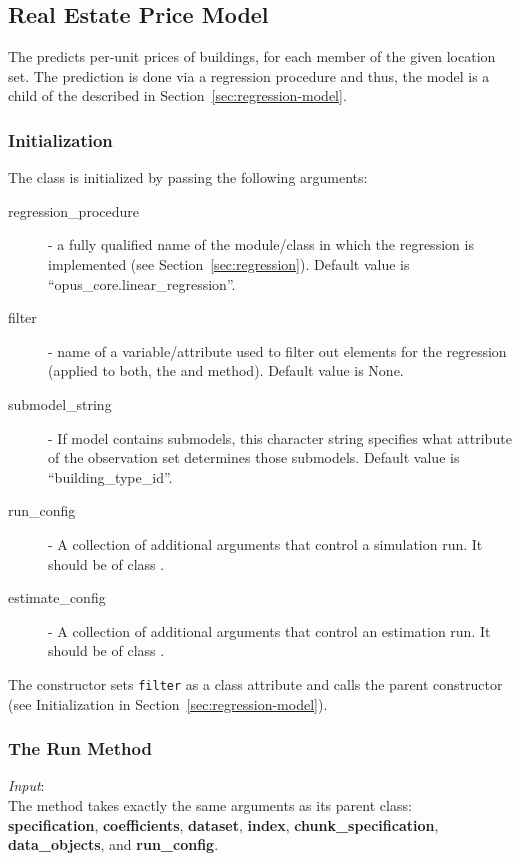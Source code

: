 
\subsection{Real Estate Price Model}
\label{sec:real-estate-price-model} 
\modelsindex
%
The  predicts per-unit prices of buildings, 
for each member of the given
location set. The prediction is done via a regression procedure and thus,
the model is a child of the  described in
Section~\ref{sec:regression-model}.

\subsubsection{Initialization}
%
The class is initialized by passing the following arguments:
\begin{description}
\item[regression_procedure] - a fully qualified name of the module/class in
  which the regression is implemented (see
  Section~\ref{sec:regression}). Default value is
  ``opus_core.linear_regression''.
\item[filter] - name of a variable/attribute used to filter out elements for
  the regression (applied to both, the  and 
  method). Default value is None.
\item[submodel_string] - If model contains submodels, this character string
  specifies what attribute of the observation set determines those
  submodels. Default value is ``building_type_id''.
\item[run_config] - A collection of additional arguments that control a
  simulation run. It should be of class .
\item[estimate_config] - A collection of additional arguments that control an
  estimation run. It should be of class .
\end{description}
The constructor sets \verb|filter| as a class attribute and calls the parent
constructor (see Initialization in Section~\ref{sec:regression-model}).

\subsubsection{The Run Method}
%
{\it Input}:\\[1mm]
The  method takes exactly the same arguments as its parent
class:\\
{\bf specification}, {\bf coefficients}, {\bf dataset}, {\bf index}, {\bf
  chunk_specification}, {\bf data_objects}, and {\bf run_config}.



